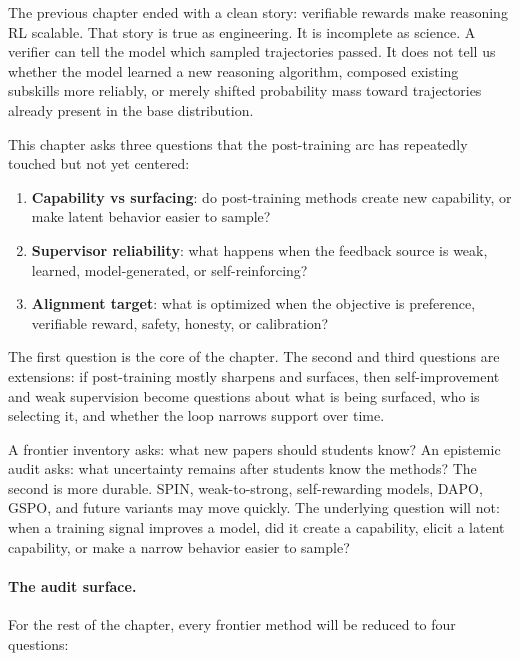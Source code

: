 The previous chapter ended with a clean story: verifiable rewards make reasoning RL scalable. That story is true as engineering. It is incomplete as science. A verifier can tell the model which sampled trajectories passed. It does not tell us whether the model learned a new reasoning algorithm, composed existing subskills more reliably, or merely shifted probability mass toward trajectories already present in the base distribution.

This chapter asks three questions that the post-training arc has repeatedly touched but not yet centered:

\begin{enumerate}[nosep]
  \item \textbf{Capability vs surfacing}: do post-training methods create new capability, or make latent behavior easier to sample?
  \item \textbf{Supervisor reliability}: what happens when the feedback source is weak, learned, model-generated, or self-reinforcing?
  \item \textbf{Alignment target}: what is optimized when the objective is preference, verifiable reward, safety, honesty, or calibration?
\end{enumerate}

The first question is the core of the chapter. The second and third questions are extensions: if post-training mostly sharpens and surfaces, then self-improvement and weak supervision become questions about what is being surfaced, who is selecting it, and whether the loop narrows support over time.

\begin{tcolorbox}[colback=blue!5, colframe=blue!40, title=\textbf{Epistemic Audit, Not Frontier Inventory}]
A frontier inventory asks: what new papers should students know? An epistemic audit asks: what uncertainty remains after students know the methods? The second is more durable. SPIN, weak-to-strong, self-rewarding models, DAPO, GSPO, and future variants may move quickly. The underlying question will not: when a training signal improves a model, did it create a capability, elicit a latent capability, or make a narrow behavior easier to sample?
\end{tcolorbox}

\paragraph{The audit surface.} For the rest of the chapter, every frontier method will be reduced to four questions:

